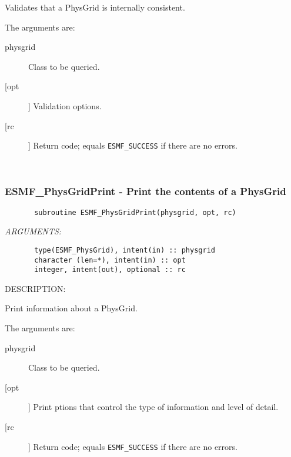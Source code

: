       Validates that a PhysGrid is internally consistent.
  
       The arguments are:
       \begin{description}
       \item[physgrid] 
            Class to be queried.
       \item[[opt]]
            Validation options.
       \item[[rc]] 
            Return code; equals {\tt ESMF\_SUCCESS} if there are no errors.
       \end{description}
   
 
\mbox{}\hrulefill\ 
 
\subsubsection{ESMF\_PhysGridPrint - Print the contents of a PhysGrid}


 
\begin{verbatim}       subroutine ESMF_PhysGridPrint(physgrid, opt, rc)\end{verbatim}{\em ARGUMENTS:}
\begin{verbatim}       type(ESMF_PhysGrid), intent(in) :: physgrid      
       character (len=*), intent(in) :: opt      
       integer, intent(out), optional :: rc           \end{verbatim}
{\sf DESCRIPTION:\\ }


        Print information about a PhysGrid.  
  
       The arguments are:
       \begin{description}
       \item[physgrid] 
            Class to be queried.
       \item[[opt]]
            Print ptions that control the type of information and level of 
            detail.
       \item[[rc]] 
            Return code; equals {\tt ESMF\_SUCCESS} if there are no errors.
       \end{description}
  
